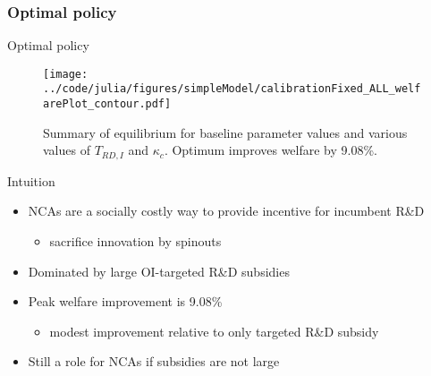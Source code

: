 \documentclass[english,usenames,dvipsnames]{beamer}
\begin{document}
\subsubsection{Optimal policy}

\begin{frame}{Optimal policy} \label{plots:all_policies} 
	\hyperlink{all_policies_overview}{}
	\begin{figure}[]
		\texttt{[image: ../code/julia/figures/simpleModel/calibrationFixed\_ALL\_welfarePlot\_contour.pdf]}
		\caption{Summary of equilibrium for baseline parameter values and various values of $T_{RD,I}$ and $\kappa_c$. Optimum improves welfare by 9.08\%.}
		\label{calibration_ALL_summaryPlot}
	\end{figure}
\end{frame}

\begin{frame}{Intuition} \label{intuition:all_policies}
	\hyperlink{all_policies_overview}{}
	\begin{itemize}
		\item <+-> NCAs are a socially costly way to provide incentive for incumbent R\&D
		\begin{itemize}
			\item sacrifice innovation by spinouts
		\end{itemize}
		\smallskip
		\item <+-> Dominated by large OI-targeted R\&D subsidies
		\smallskip
		\item <+-> Peak welfare improvement is 9.08\%
		\begin{itemize}
			\item modest improvement relative to only targeted R\&D subsidy
		\end{itemize}
		\item <+-> Still a role for NCAs if subsidies are not large
		\smallskip
	\end{itemize}
\end{frame}
\end{document}
